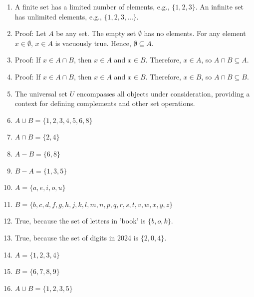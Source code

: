 \documentclass[12pt]{article}
\begin{document}
\begin{enumerate}
    \item A finite set has a limited number of elements, e.g., \(\{1, 2, 3\}\). An infinite set has unlimited elements, e.g., \(\{1, 2, 3, \ldots\}\).

    \item Proof: Let \( A \) be any set. The empty set \( \emptyset \) has no elements. For any element \( x \in \emptyset \), \( x \in A \) is vacuously true. Hence, \( \emptyset \subseteq A \).

    \item Proof: If \( x \in A \cap B \), then \( x \in A \) and \( x \in B \). Therefore, \( x \in A \), so \( A \cap B \subseteq A \).

    \item Proof: If \( x \in A \cap B \), then \( x \in A \) and \( x \in B \). Therefore, \( x \in B \), so \( A \cap B \subseteq B \).

    \item The universal set \( U \) encompasses all objects under consideration, providing a context for defining complements and other set operations.

    \item \( A \cup B = \{1, 2, 3, 4, 5, 6, 8\} \)

    \item \( A \cap B = \{2, 4\} \)

    \item \( A - B = \{6, 8\} \)

    \item \( B - A = \{1, 3, 5\} \)

    \item \( A = \{a, e, i, o, u\} \)

    \item \( B = \{b, c, d, f, g, h, j, k, l, m, n, p, q, r, s, t, v, w, x, y, z\} \)

    \item True, because the set of letters in 'book' is \(\{b, o, k\}\).

    \item True, because the set of digits in 2024 is \(\{2, 0, 4\}\).

    \item \( A = \{1, 2, 3, 4\} \)

    \item \( B = \{6, 7, 8, 9\} \)

    \item \( A \cup B = \{1, 2, 3, 5\} \)


\end{enumerate}
\end{document}
